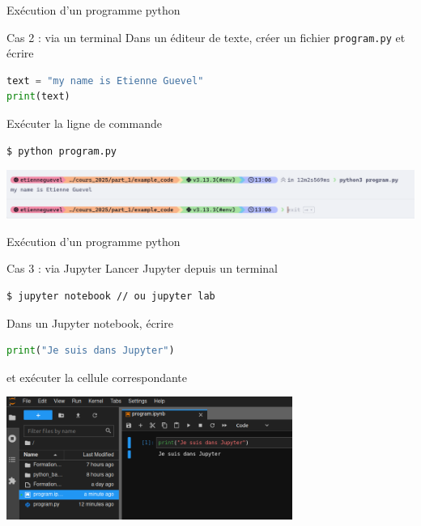 \begin{frame}[fragile]{Exécution d'un programme python}

  \begin{block}{Cas 2 : via un terminal}
    \medskip
    Dans un éditeur de texte, créer un fichier \texttt{program.py} et écrire
\begin{lstlisting}[language=python, numbers=none]
text = "my name is Etienne Guevel"
print(text)
\end{lstlisting}

    Exécuter la ligne de commande
\begin{lstlisting}[language=bash, morekeywords=$, numbers=none]
$ python program.py
\end{lstlisting}
  \end{block}

  \begin{center}
    \includegraphics[width=1.\textwidth]{img/dummy_program}
  \end{center}
\end{frame}


\begin{frame}[fragile]{Exécution d'un programme python}

  \begin{block}{Cas 3 : via Jupyter}
    \medskip
    Lancer Jupyter depuis un terminal
\begin{lstlisting}[language=bash, morekeywords=$, numbers=none]
$ jupyter notebook // ou jupyter lab
\end{lstlisting}
    Dans un Jupyter notebook, écrire
\begin{lstlisting}[language=python, numbers=none]
print("Je suis dans Jupyter")
\end{lstlisting}

    et exécuter la cellule correspondante
  \end{block}

  \begin{center}
    \includegraphics[width=0.7\textwidth]{img/jupyter_program}
  \end{center}
\end{frame}

